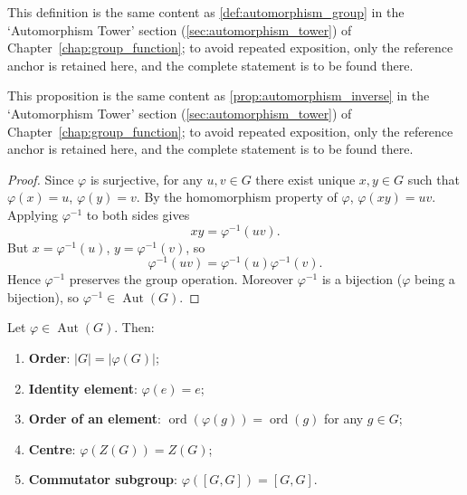 \begin{definition}\label{def:higher_automorphism_group}
This definition is the same content as \cref{def:automorphism_group} in the `Automorphism Tower' section (\cref{sec:automorphism_tower}) of Chapter~\ref{chap:group_function}; to avoid repeated exposition, only the reference anchor is retained here, and the complete statement is to be found there.
\end{definition}

\begin{proposition}\label{prop:higher_automorphism_inverse}
This proposition is the same content as \cref{prop:automorphism_inverse} in the `Automorphism Tower' section (\cref{sec:automorphism_tower}) of Chapter~\ref{chap:group_function}; to avoid repeated exposition, only the reference anchor is retained here, and the complete statement is to be found there.
\end{proposition}

\begin{proof}
Since $\varphi$ is surjective, for any $u,v \in G$ there exist unique $x,y \in G$ such that $\varphi(x)=u$, $\varphi(y)=v$. By the homomorphism property of $\varphi$, $\varphi(xy)=uv$. Applying $\varphi^{-1}$ to both sides gives
\[
xy = \varphi^{-1}(uv).
\]
But $x=\varphi^{-1}(u)$, $y=\varphi^{-1}(v)$, so
\[
\varphi^{-1}(uv) = \varphi^{-1}(u)\varphi^{-1}(v).
\]
Hence $\varphi^{-1}$ preserves the group operation. Moreover $\varphi^{-1}$ is a bijection ($\varphi$ being a bijection), so $\varphi^{-1}\in\operatorname{Aut}(G)$.
\end{proof}

\begin{property}\label{prop:higher_automorphism_invariants}
Let $\varphi \in \operatorname{Aut}(G)$. Then:
\begin{enumerate}[label=(\roman*)]
    \item \textbf{Order}: $|G| = |\varphi(G)|$;
    \item \textbf{Identity element}: $\varphi(e) = e$;
    \item \textbf{Order of an element}: $\operatorname{ord}(\varphi(g)) = \operatorname{ord}(g)$ for any $g\in G$;
    \item \textbf{Centre}: $\varphi(Z(G)) = Z(G)$;
    \item \textbf{Commutator subgroup}: $\varphi([G,G]) = [G,G]$.
\end{enumerate}
\end{property}

